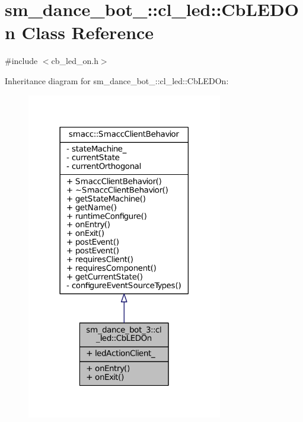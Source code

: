 \hypertarget{classsm__dance__bot__3_1_1cl__led_1_1CbLEDOn}{}\section{sm\+\_\+dance\+\_\+bot\+\_\+:\+:cl\+\_\+led\+:\+:Cb\+L\+E\+D\+On Class Reference}
\label{classsm__dance__bot__3_1_1cl__led_1_1CbLEDOn}


{\ttfamily \#include $<$cb\+\_\+led\+\_\+on.\+h$>$}



Inheritance diagram for sm\+\_\+dance\+\_\+bot\+\_\+:\+:cl\+\_\+led\+:\+:Cb\+L\+E\+D\+On\+:
\nopagebreak
\begin{figure}[H]
\begin{center}
\leavevmode
\includegraphics[width=242pt]{classsm__dance__bot__3_1_1cl__led_1_1CbLEDOn__inherit__graph}
\end{center}
\end{figure}


